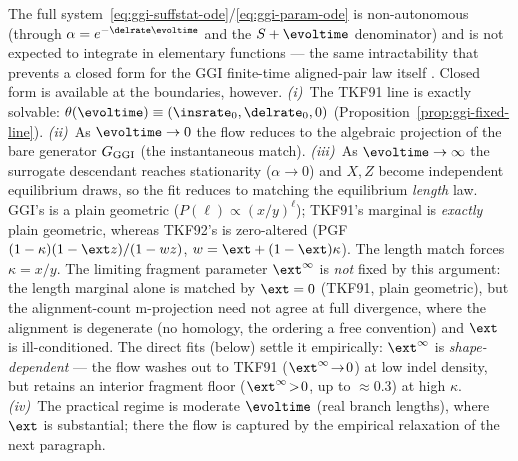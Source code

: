\begin{remark}
\label{rem:ggi-solvable}
The full system~\eqref{eq:ggi-suffstat-ode}/\eqref{eq:ggi-param-ode} is
non-autonomous (through $\alpha=e^{-\delrate\evoltime}$ and the
$S+\evoltime$ denominator) and is not expected to integrate in elementary
functions --- the same intractability that prevents a closed form for the GGI
finite-time aligned-pair law itself \cite{Holmes2020}.  Closed form is available
at the boundaries, however.  \emph{(i)}~The TKF91 line is exactly solvable:
$\theta(\evoltime)\equiv(\insrate_0,\delrate_0,0)$
(Proposition~\ref{prop:ggi-fixed-line}).  \emph{(ii)}~As $\evoltime\to0$ the
flow reduces to the algebraic projection of the bare generator $G_{\mathrm{GGI}}$ (the
instantaneous match).  \emph{(iii)}~As $\evoltime\to\infty$ the surrogate descendant reaches
stationarity ($\alpha\to0$) and $X,Z$ become independent equilibrium draws, so
the fit reduces to matching the equilibrium \emph{length} law.  GGI's is a plain
geometric ($P(\ell)\propto(x/y)^\ell$); TKF91's marginal is \emph{exactly} plain
geometric, whereas TKF92's is zero-altered (PGF $(1-\kappa)(1-\ext z)/(1-wz)$,
$w=\ext+(1-\ext)\kappa$).  The length match forces $\kappa=x/y$.  The limiting
fragment parameter $\ext^\infty$ is \emph{not} fixed by this argument: the length
marginal alone is matched by $\ext=0$ (TKF91, plain geometric), but the
alignment-count m-projection need not agree at full divergence, where the
alignment is degenerate (no homology, the ordering a free convention) and $\ext$
is ill-conditioned.  The direct fits (below) settle it empirically: $\ext^\infty$
is \emph{shape-dependent} --- the flow washes out to TKF91 ($\ext^\infty\!\to\!0$)
at low indel density, but retains an interior fragment floor ($\ext^\infty\!>\!0$,
up to $\approx0.3$) at high $\kappa$.
\emph{(iv)}~The practical regime is moderate $\evoltime$ (real branch lengths),
where $\ext$ is substantial; there the flow is captured by the empirical
relaxation of the next paragraph.
\end{remark}

